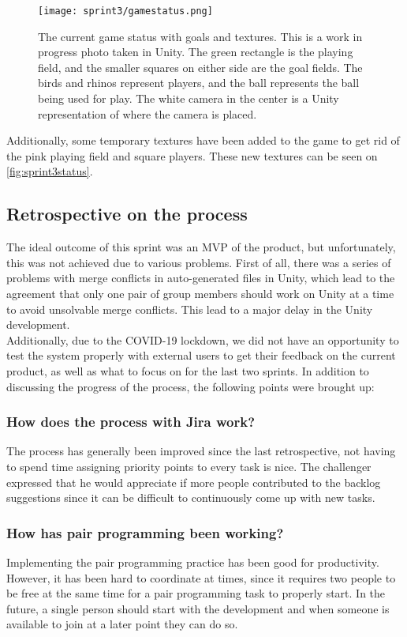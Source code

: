 \begin{figure}[H]
	\centering
	\texttt{[image: sprint3/gamestatus.png]}
	\caption{The current game status with goals and textures. This is a work in progress photo taken in Unity. The green rectangle is the playing field, and the smaller squares on either side are the goal fields. The birds and rhinos represent players, and the ball represents the ball being used for play. The white camera in the center is a Unity representation of where the camera is placed.}
	\label{fig:sprint3status}
\end{figure}
\noindent
Additionally, some temporary textures have been added to the game to get rid of the pink playing field and square players.
These new textures can be seen on \autoref{fig:sprint3status}.

\subsection{Retrospective on the process}
The ideal outcome of this sprint was an MVP of the product, but unfortunately, this was not achieved due to various problems.
First of all, there was a series of problems with merge conflicts in auto-generated files in Unity, which lead to the agreement that only one pair of group members should work on Unity at a time to avoid unsolvable merge conflicts.
This lead to a major delay in the Unity development.\\
Additionally, due to the COVID-19 lockdown, we did not have an opportunity to test the system properly with external users to get their feedback on the current product, as well as what to focus on for the last two sprints.
In addition to discussing the progress of the process, the following points were brought up:

\subsubsection*{How does the process with Jira work?}
The process has generally been improved since the last retrospective, not having to spend time assigning priority points to every task is nice.
The challenger expressed that he would appreciate if more people contributed to the backlog suggestions since it can be difficult to continuously come up with new tasks.


\subsubsection*{How has pair programming been working?}
Implementing the pair programming practice has been good for productivity.
However, it has been hard to coordinate at times, since it requires two people to be free at the same time for a pair programming task to properly start.
In the future, a single person should start with the development and when someone is available to join at a later point they can do so.

